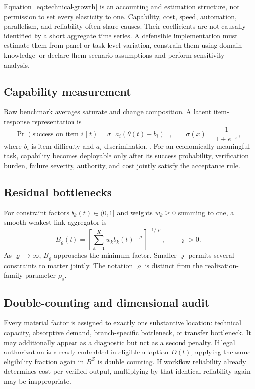 Equation~\eqref{eq:technical-growth} is an accounting and estimation structure, not permission to set every elasticity to one. Capability, cost, speed, automation, parallelism, and reliability often share causes. Their coefficients are not causally identified by a short aggregate time series. A defensible implementation must estimate them from panel or task-level variation, constrain them using domain knowledge, or declare them scenario assumptions and perform sensitivity analysis.

\subsection{Capability measurement}

Raw benchmark averages saturate and change composition. A latent item-response representation is
\begin{equation}
\Pr(\text{success on item }i\mid t)=\sigma\!\left[a_i(\theta(t)-b_i)\right],
\qquad \sigma(x)=\frac{1}{1+e^{-x}},
\end{equation}
where $b_i$ is item difficulty and $a_i$ discrimination \citep{rasch1980}. For an economically meaningful task, capability becomes deployable only after its success probability, verification burden, failure severity, authority, and cost jointly satisfy the acceptance rule.

\subsection{Residual bottlenecks}

For constraint factors $b_k(t)\in(0,1]$ and weights $w_k\ge0$ summing to one, a smooth weakest-link aggregator is
\begin{equation}
\label{eq:bottleneck}
B_\varrho(t)=\left[\sum_{k=1}^{K}w_k b_k(t)^{-\varrho}\right]^{-1/\varrho},\qquad \varrho>0.
\end{equation}
As $\varrho\rightarrow\infty$, $B_\varrho$ approaches the minimum factor. Smaller $\varrho$ permits several constraints to matter jointly. The notation $\varrho$ is distinct from the realization-family parameter $\rho_s$.

\subsection{Double-counting and dimensional audit}

Every material factor is assigned to exactly one substantive location: technical capacity, absorptive demand, branch-specific bottleneck, or transfer bottleneck. It may additionally appear as a diagnostic but not as a second penalty. If legal authorization is already embedded in eligible adoption $D(t)$, applying the same eligibility fraction again in $B^Z$ is double counting. If workflow reliability already determines cost per verified output, multiplying by that identical reliability again may be inappropriate.

